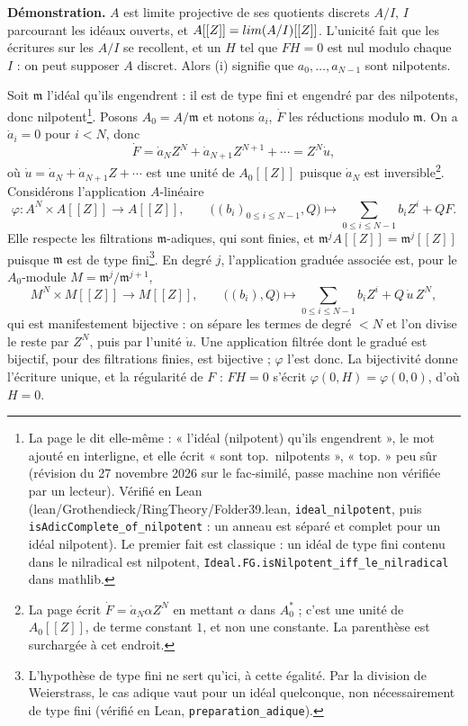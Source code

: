 \documentclass[11pt,a4paper]{article}
\begin{document}
\textbf{Démonstration.} $A$ est limite projective de ses quotients discrets
$A/I$, $I$ parcourant les idéaux ouverts, et $A[[Z]] = \varprojlim (A/I)[[Z]]$.
L'unicité fait que les écritures sur les $A/I$ se recollent, et un $H$ tel que
$FH = 0$ est nul modulo chaque $I$ : on peut supposer $A$ discret. Alors (i)
signifie que $a_0, \ldots, a_{N-1}$ sont nilpotents.

Soit $\mathfrak{m}$ l'idéal qu'ils engendrent : il est de type fini et engendré
par des nilpotents, donc nilpotent\footnote{La page le dit elle-même :
« l'idéal (nilpotent) qu'ils engendrent », le mot ajouté en interligne, et
elle écrit « sont top.\ nilpotents », « top. » peu sûr (révision du 27
novembre 2026 sur le fac-similé, passe machine non vérifiée par un lecteur).
Vérifié en Lean
(lean/Grothendieck/RingTheory/Folder39.lean, \texttt{ideal\_nilpotent}, puis
\texttt{isAdicComplete\_of\_nilpotent} : un anneau est séparé et complet pour un
idéal nilpotent). Le premier fait est classique : un idéal de type fini contenu
dans le nilradical est nilpotent, \texttt{Ideal.FG.isNilpotent\_iff\_le\_nilradical}
dans mathlib.}. Posons $A_0 = A/\mathfrak{m}$ et notons
$\dot{a}_i$, $\dot{F}$ les réductions modulo $\mathfrak{m}$. On a $\dot{a}_i = 0$
pour $i < N$, donc
\[
  \dot{F} = \dot{a}_N Z^N + \dot{a}_{N+1} Z^{N+1} + \cdots = Z^N \dot{u},
\]
où $\dot{u} = \dot{a}_N + \dot{a}_{N+1} Z + \cdots$ est une unité de $A_0[[Z]]$
puisque $\dot{a}_N$ est inversible\footnote{La page écrit
$\dot{F} = \dot{a}_N \alpha Z^N$ en mettant $\alpha$ dans $A_0^*$ ; c'est une unité
de $A_0[[Z]]$, de terme constant $1$, et non une constante. La parenthèse est
surchargée à cet endroit.}. Considérons l'application $A$-linéaire
\[
  \varphi : A^N \times A[[Z]] \longrightarrow A[[Z]], \qquad
  \bigl((b_i)_{0 \leq i \leq N-1}, Q\bigr) \longmapsto
  \sum_{0 \leq i \leq N-1} b_i Z^i + QF.
\]
Elle respecte les filtrations $\mathfrak{m}$-adiques, qui sont finies, et
$\mathfrak{m}^j A[[Z]] = \mathfrak{m}^j[[Z]]$ puisque $\mathfrak{m}$ est de type
fini\footnote{L'hypothèse de type fini ne sert qu'ici, à cette égalité. Par la
division de Weierstrass, le cas adique vaut pour un idéal quelconque, non
nécessairement de type fini (vérifié en Lean, \texttt{preparation\_adique}).}.
En degré $j$, l'application graduée associée est, pour le $A_0$-module
$M = \mathfrak{m}^j/\mathfrak{m}^{j+1}$,
\[
  M^N \times M[[Z]] \longrightarrow M[[Z]], \qquad
  \bigl((b_i), Q\bigr) \longmapsto \sum_{0 \leq i \leq N-1} b_i Z^i + Q\, \dot{u}\, Z^N,
\]
qui est manifestement bijective : on sépare les termes de degré $< N$ et l'on
divise le reste par $Z^N$, puis par l'unité $\dot{u}$. Une application filtrée
dont le gradué est bijectif, pour des filtrations finies, est bijective ;
$\varphi$ l'est donc. La bijectivité donne l'écriture unique, et la régularité
de $F$ : $FH = 0$ s'écrit $\varphi(0, H) = \varphi(0, 0)$, d'où $H = 0$.
\end{document}
